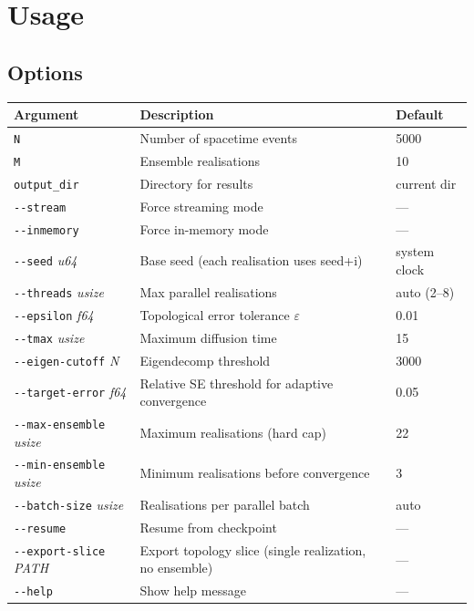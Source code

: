 \documentclass[11pt, a4paper, openany]{book}
\newcommand{\code}[1]{\texttt{#1}}
\begin{document}
\chapter{Usage}

\section{Options}

\begin{table}[H]
\centering
\begin{tabular}{@{} l l l @{}}
\toprule
\textbf{Argument} & \textbf{Description} & \textbf{Default} \\
\midrule
\code{N}            & Number of spacetime events  & 5000 \\
\code{M}            & Ensemble realisations       & 10 \\
\code{output\_dir}  & Directory for results       & current dir \\
\code{-{}-stream}         & Force streaming mode                    & --- \\
\code{-{}-inmemory}       & Force in-memory mode                    & --- \\
\code{-{}-seed} \textit{u64}       & Base seed (each realisation uses seed+i) & system clock \\
\code{-{}-threads} \textit{usize}  & Max parallel realisations               & auto (2--8) \\
\code{-{}-epsilon} \textit{f64}    & Topological error tolerance $\varepsilon$ & 0.01 \\
\code{-{}-tmax} \textit{usize}     & Maximum diffusion time                  & 15 \\
\code{-{}-eigen-cutoff} \textit{N} & Eigendecomp threshold                   & 3000 \\
\code{-{}-target-error} \textit{f64} & Relative SE threshold for adaptive convergence & 0.05 \\
\code{-{}-max-ensemble} \textit{usize} & Maximum realisations (hard cap) & 22 \\
\code{-{}-min-ensemble} \textit{usize} & Minimum realisations before convergence & 3 \\
\code{-{}-batch-size} \textit{usize} & Realisations per parallel batch & auto \\
\code{-{}-resume}         & Resume from checkpoint                  & --- \\
\code{-{}-export-slice} \textit{PATH} & Export topology slice (single realization, no ensemble) & --- \\
\code{-{}-help}           & Show help message                       & --- \\
\bottomrule
\end{tabular}
\end{table}
\end{document}
